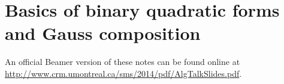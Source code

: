 
\section{Basics of binary quadratic forms and Gauss composition}\label{sec:granville-i}

An official Beamer version of these notes can be found online at 
\url{http://www.crm.umontreal.ca/sms/2014/pdf/AlgTalkSlides.pdf}. 





